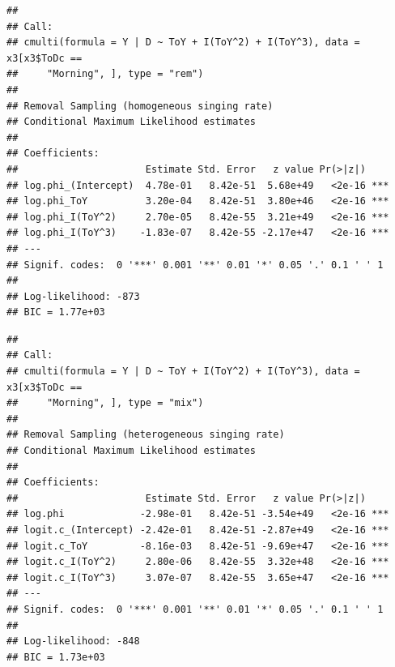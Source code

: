 \documentclass[12pt,]{book}
\newenvironment{Shaded}{\begin{snugshade}}{\end{snugshade}}
\newcommand{\CommentTok}[1]{\textcolor[rgb]{0.56,0.35,0.01}{\textit{#1}}}
\newcommand{\DataTypeTok}[1]{\textcolor[rgb]{0.13,0.29,0.53}{#1}}
\newcommand{\DecValTok}[1]{\textcolor[rgb]{0.00,0.00,0.81}{#1}}
\newcommand{\KeywordTok}[1]{\textcolor[rgb]{0.13,0.29,0.53}{\textbf{#1}}}
\newcommand{\NormalTok}[1]{#1}
\newcommand{\OperatorTok}[1]{\textcolor[rgb]{0.81,0.36,0.00}{\textbf{#1}}}
\newcommand{\StringTok}[1]{\textcolor[rgb]{0.31,0.60,0.02}{#1}}
\begin{document}
\begin{verbatim}
## 
## Call:
## cmulti(formula = Y | D ~ ToY + I(ToY^2) + I(ToY^3), data = x3[x3$ToDc == 
##     "Morning", ], type = "rem")
## 
## Removal Sampling (homogeneous singing rate)
## Conditional Maximum Likelihood estimates
## 
## Coefficients:
##                      Estimate Std. Error   z value Pr(>|z|)    
## log.phi_(Intercept)  4.78e-01   8.42e-51  5.68e+49   <2e-16 ***
## log.phi_ToY          3.20e-04   8.42e-51  3.80e+46   <2e-16 ***
## log.phi_I(ToY^2)     2.70e-05   8.42e-55  3.21e+49   <2e-16 ***
## log.phi_I(ToY^3)    -1.83e-07   8.42e-55 -2.17e+47   <2e-16 ***
## ---
## Signif. codes:  0 '***' 0.001 '**' 0.01 '*' 0.05 '.' 0.1 ' ' 1 
## 
## Log-likelihood: -873 
## BIC = 1.77e+03
\end{verbatim}

\begin{Shaded}
\end{Shaded}

\begin{verbatim}
## 
## Call:
## cmulti(formula = Y | D ~ ToY + I(ToY^2) + I(ToY^3), data = x3[x3$ToDc == 
##     "Morning", ], type = "mix")
## 
## Removal Sampling (heterogeneous singing rate)
## Conditional Maximum Likelihood estimates
## 
## Coefficients:
##                      Estimate Std. Error   z value Pr(>|z|)    
## log.phi             -2.98e-01   8.42e-51 -3.54e+49   <2e-16 ***
## logit.c_(Intercept) -2.42e-01   8.42e-51 -2.87e+49   <2e-16 ***
## logit.c_ToY         -8.16e-03   8.42e-51 -9.69e+47   <2e-16 ***
## logit.c_I(ToY^2)     2.80e-06   8.42e-55  3.32e+48   <2e-16 ***
## logit.c_I(ToY^3)     3.07e-07   8.42e-55  3.65e+47   <2e-16 ***
## ---
## Signif. codes:  0 '***' 0.001 '**' 0.01 '*' 0.05 '.' 0.1 ' ' 1 
## 
## Log-likelihood: -848 
## BIC = 1.73e+03
\end{verbatim}
\end{document}
